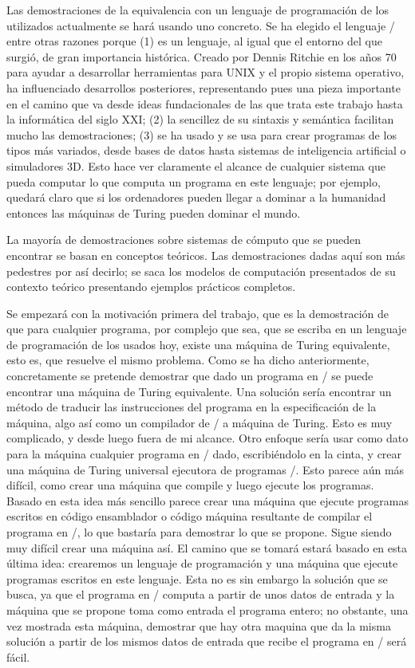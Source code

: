 Las demostraciones de la equivalencia con un lenguaje de programación de los utilizados actualmente
se hará usando uno concreto. Se ha elegido el lenguaje \C/ entre otras razones porque (1) es un
lenguaje, al igual que el entorno del que surgió, de gran importancia histórica. Creado por Dennis
Ritchie en los años 70 para ayudar a desarrollar herramientas para UNIX y el propio sistema
operativo, ha influenciado desarrollos posteriores, representando pues una pieza importante en el
camino que va desde ideas fundacionales de las que trata este trabajo hasta la informática del siglo
XXI; (2) la sencillez de su sintaxis y semántica facilitan mucho las demostraciones; (3) se ha usado
y se usa para crear programas de los tipos más variados, desde bases de datos hasta sistemas de
inteligencia artificial o simuladores 3D. Esto hace ver claramente el alcance de cualquier sistema
que pueda computar lo que computa un programa en este lenguaje; por ejemplo, quedará claro que si
los ordenadores pueden llegar a dominar a la humanidad entonces las máquinas de Turing pueden
dominar el mundo.

La mayoría de demostraciones sobre sistemas de cómputo que se pueden encontrar se basan en conceptos
teóricos. Las demostraciones dadas aquí son más pedestres por así decirlo; se saca los modelos de
computación presentados de su contexto teórico presentando ejemplos prácticos completos.

Se empezará con la motivación primera del trabajo, que es la demostración de que para cualquier
programa, por complejo que sea, que se escriba en un lenguaje de programación de los usados hoy,
existe una máquina de Turing equivalente, esto es, que resuelve el mismo problema. Como se ha dicho
anteriormente, concretamente se pretende demostrar que dado un programa en \C/ se puede encontrar una
máquina de Turing equivalente.  Una solución sería encontrar un método de traducir las instrucciones
del programa en la especificación de la máquina, algo así como un compilador de \C/ a máquina de
Turing. Esto es muy complicado, y desde luego fuera de mi alcance. Otro enfoque sería usar como dato
para la máquina cualquier programa en \C/ dado, escribiéndolo en la cinta, y crear una máquina de
Turing universal ejecutora de programas \C/. Esto parece aún más difícil, como crear una máquina que
compile y luego ejecute los programas. Basado en esta idea más sencillo parece crear una máquina que
ejecute programas escritos en código ensamblador o código máquina resultante de compilar el programa
en \C/, lo que bastaría para demostrar lo que se propone. Sigue siendo muy difícil crear una máquina
así. El camino que se tomará estará basado en esta última idea: crearemos un lenguaje de
programación y una máquina que ejecute programas escritos en este lenguaje.  Esta no es sin embargo
la solución que se busca, ya que el programa en \C/ computa a partir de unos datos de entrada y la
máquina que se propone toma como entrada el programa entero; no obstante, una vez mostrada esta
máquina, demostrar que hay otra maquina que da la misma solución a partir de los mismos datos de
entrada que recibe el programa en \C/ será fácil.

